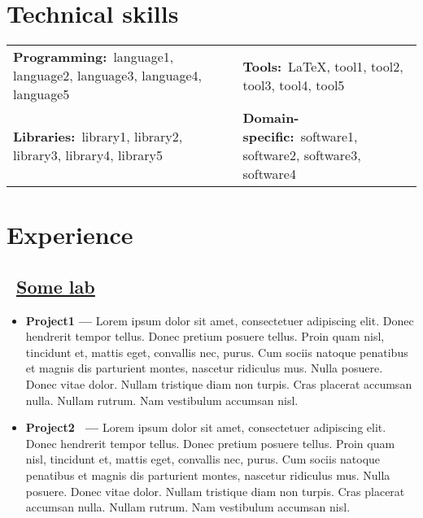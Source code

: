 \documentclass{article}
\begin{document}
\section{Technical skills}
	\begin{flushleft}
	\begin{table}[!h]
	\begin{tabularx}{\linewidth}{lX}
		\textbf{Programming:}\
		language1,
		language2,
		language3,
		language4,
		language5
		&
		\textbf{Tools:}\
		{\LaTeX},
		tool1,
		tool2,
		tool3,
		tool4,
		tool5
		\\

		\textbf{Libraries:}\
		library1,
		library2,
		library3,
		library4,
		library5
		&
		\textbf{Domain-specific:}\
		software1,
		software2,
		software3,
		software4
	\end{tabularx}
	\end{table}
	\end{flushleft}

\vspace{-\baselineskip}
\vspace{-0.25em}

\section{Experience}
  \subsection{\faUniversity~\href{https://www.example.com}{\underline{Some lab}}}
	\begin{itemize}
		\item \textbf{Project1 --- }
		Lorem ipsum dolor sit amet, consectetuer adipiscing elit.  Donec hendrerit tempor tellus.  Donec pretium posuere tellus.  Proin quam nisl, tincidunt et, mattis eget, convallis nec, purus.  Cum sociis natoque penatibus et magnis dis parturient montes, nascetur ridiculus mus.  Nulla posuere.  Donec vitae dolor.  Nullam tristique diam non turpis.  Cras placerat accumsan nulla.  Nullam rutrum.  Nam vestibulum accumsan nisl.

		\item \textbf{Project2~\href{https://github.com/username/repo}{\underline{\faGithub}} --- }
		Lorem ipsum dolor sit amet, consectetuer adipiscing elit.  Donec hendrerit tempor tellus.  Donec pretium posuere tellus.  Proin quam nisl, tincidunt et, mattis eget, convallis nec, purus.  Cum sociis natoque penatibus et magnis dis parturient montes, nascetur ridiculus mus.  Nulla posuere.  Donec vitae dolor.  Nullam tristique diam non turpis.  Cras placerat accumsan nulla.  Nullam rutrum.  Nam vestibulum accumsan nisl.
	\end{itemize}
\end{document}
